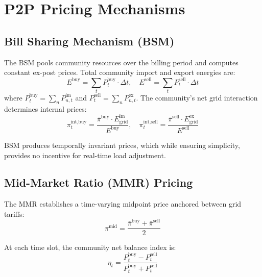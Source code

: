 \documentclass[conference]{IEEEtran}
\begin{document}
\section{P2P Pricing Mechanisms}

\subsection{Bill Sharing Mechanism (BSM)}

The BSM pools community resources over the billing period and computes constant ex-post prices. Total community import and export energies are:
\begin{equation}
    E^{\text{buy}} = \sum_{t} P_t^{\text{buy}} \cdot \Delta t, \quad E^{\text{sell}} = \sum_{t} P_t^{\text{sell}} \cdot \Delta t
    \label{eq:bsm_energy}
\end{equation}
where $P_t^{\text{buy}} = \sum_{n} P_{n,t}^{\text{im}}$ and $P_t^{\text{sell}} = \sum_{n} P_{n,t}^{\text{ex}}$. The community's net grid interaction determines internal prices:
\begin{equation}
    \pi_t^{\text{int,buy}} = \frac{\bar{\pi}^{\text{buy}} \cdot E_{\text{grid}}^{\text{im}}}{E^{\text{buy}}}, \quad \pi_t^{\text{int,sell}} = \frac{\bar{\pi}^{\text{sell}} \cdot E_{\text{grid}}^{\text{ex}}}{E^{\text{sell}}}
    \label{eq:bsm_prices}
\end{equation}

BSM produces temporally invariant prices, which while ensuring simplicity, provides no incentive for real-time load adjustment.

\subsection{Mid-Market Ratio (MMR) Pricing}

The MMR establishes a time-varying midpoint price anchored between grid tariffs:
\begin{equation}
    \pi^{\text{mid}} = \frac{\bar{\pi}^{\text{buy}} + \bar{\pi}^{\text{sell}}}{2}
    \label{eq:mmr_mid}
\end{equation}

At each time slot, the community net balance index is:
\begin{equation}
    \eta_t = \frac{P_t^{\text{buy}} - P_t^{\text{sell}}}{P_t^{\text{buy}} + P_t^{\text{sell}}}
    \label{eq:mmr_balance}
\end{equation}
\end{document}
